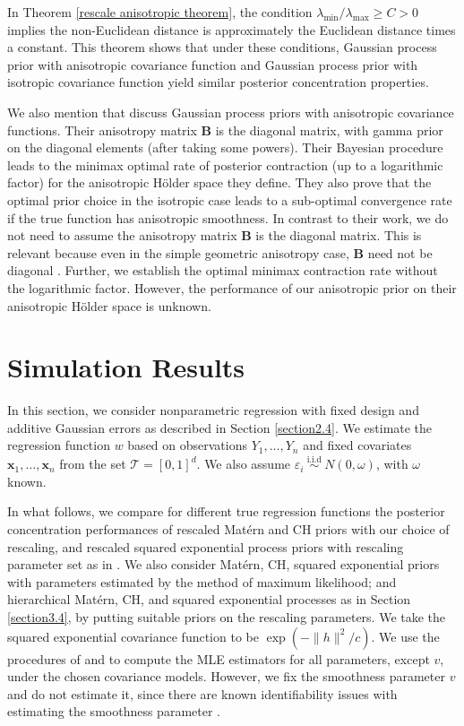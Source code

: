 \documentclass[ejs,noshowframe]{imsart}
\theoremstyle{plain}
\theoremstyle{definition}
\theoremstyle{remark}
\begin{document}
 In Theorem \ref{rescale anisotropic theorem}, the condition $\lambda_{\min}/\lambda_{\max} \ge C >0$ implies the non-Euclidean distance is approximately the Euclidean distance times a constant. This theorem shows that under these conditions,  Gaussian process prior with anisotropic  covariance
function  and Gaussian process prior with isotropic  covariance
function yield similar posterior concentration properties.

We also mention that \cite{bhattacharya2014anisotropic} discuss  Gaussian process priors with anisotropic  covariance functions. Their anisotropy matrix $\bm{B}$ is the diagonal matrix, with gamma prior  on the diagonal elements (after taking some powers).  Their Bayesian procedure leads to the minimax optimal
rate of posterior contraction (up to a logarithmic factor) for the anisotropic H\"older space they define. They also  prove that the optimal prior choice in the isotropic case leads to a sub-optimal convergence rate if the true function has anisotropic smoothness. In contrast to their work, we do not need to assume the anisotropy matrix $\bm{B}$ is the diagonal matrix. This is relevant because even in the simple geometric anisotropy case, $\bm{B}$ need not be diagonal \citep{haskard2007anisotropic}. Further, we establish the optimal minimax contraction rate without the logarithmic factor.  However, the performance of our anisotropic prior on their anisotropic H\"older space is unknown.




\section{Simulation Results} \label{section5}
In this section, we consider nonparametric regression with fixed design and additive Gaussian errors as described in Section \ref{section2.4}.  We  estimate the regression function $w$ based on observations $Y_1, \ldots, Y_n$  and  fixed covariates $\bm{x}_1, \ldots, \bm{x}_n$ from the set $\mathcal{T}=[0,1]^d$.  We also assume $\varepsilon_i \stackrel{\text { i.i.d }}{\sim} N\left(0, \omega\right)$, with $\omega$ known.  

In what follows, we compare  for  different true regression functions the posterior concentration performances of  rescaled  Mat\'ern and  CH priors with our choice of rescaling, and rescaled squared exponential process priors with rescaling parameter set as in \cite{van2007bayesian}. We also consider   Mat\'ern, CH, squared exponential priors with parameters estimated by the method of  maximum likelihood;  and hierarchical Mat\'ern,  CH, and  squared exponential processes as in Section  \ref{section3.4},  by putting suitable priors on  the rescaling parameters.  We take the squared exponential covariance function to be $\exp{(-\|h\|^2/c)}$.   We use the procedures of \cite{stein1999interpolation} and \citet{ma2022beyond} to compute the MLE estimators for all parameters, except $v$, under the chosen covariance models. However, we fix the smoothness parameter $v$ and do not estimate it, since there are known identifiability issues with estimating the smoothness parameter \citep{gu2018robust}. 
\end{document}
